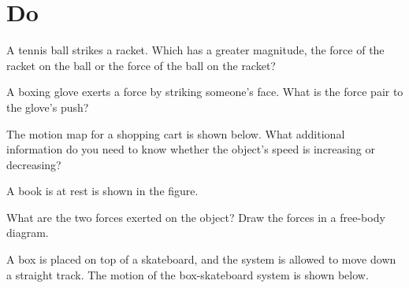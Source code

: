 \documentclass[answers]{exam}
\begin{document}
\section*{Do}

\begin{questions}

\question %
A tennis ball strikes a racket. Which has a greater magnitude, the force of the racket on the ball or the force of the ball on the racket?

\question %
A boxing glove exerts a force by striking someone's face. What is the force pair to the glove's push?

\question %
The motion map for a shopping cart is shown below. What additional information do you need to know whether the object's speed is increasing or decreasing?

\begin{center}
\end{center}


\question \label{PbScd} %
A book is at rest is shown in the figure.

\begin{center}
\end{center}

What are the two forces exerted on the object? Draw the forces in a free-body diagram.

\clearpage

\question %
A box is placed on top of a skateboard, and the system is allowed to move down a straight track. The motion of the box-skateboard system is shown below.

\begin{center}
\end{center}


\end{questions}
\end{document}
